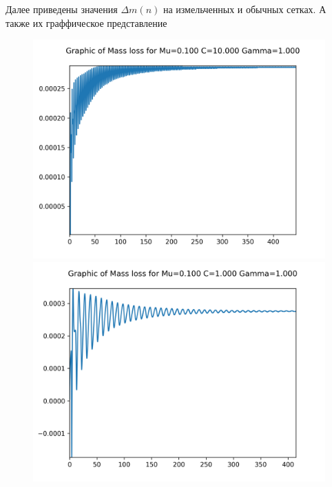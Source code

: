 \newpage
Далее приведены значения $\Delta m(n)$ на измельченных и обычных сетках. А также их граффическое представление








\newpage
\begin{figure}[H]
	\centering
	\includegraphics[scale=0.65]{../graphs_data_nonsmooth_2/mass/Graph_mass_mu0.100_C10.000_gamma1.000.png}
	\includegraphics[scale=0.65]{../graphs_data_nonsmooth_2/mass/Graph_mass_mu0.100_C1.000_gamma1.000.png}	

\end{figure}
